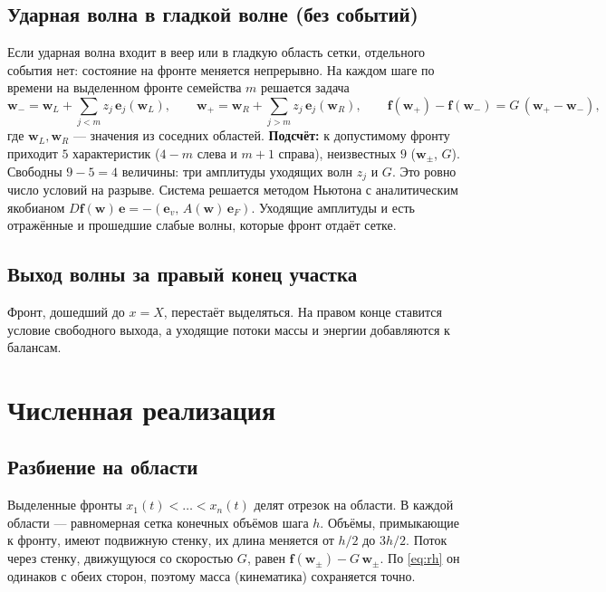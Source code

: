 \documentclass[11pt,a4paper]{article}
\theoremstyle{definition}
\theoremstyle{remark}
\newcommand{\bw}{\mathbf w}
\begin{document}
\subsection{Ударная волна в гладкой волне (без событий)}
Если ударная волна входит в веер или в гладкую область сетки, отдельного события нет: состояние на
фронте меняется непрерывно. На каждом шаге по времени на выделенном фронте семейства $m$ решается
задача
\begin{equation}\label{eq:front}
\bw_- = \bw_L + \sum_{j<m} z_j\,\mathbf e_j(\bw_L),\qquad
\bw_+ = \bw_R + \sum_{j>m} z_j\,\mathbf e_j(\bw_R),\qquad
\mathbf f(\bw_+)-\mathbf f(\bw_-) = G\,(\bw_+-\bw_-),
\end{equation}
где $\bw_L,\bw_R$ --- значения из соседних областей. \textbf{Подсчёт:} к допустимому фронту приходит
$5$ характеристик ($4-m$ слева и $m+1$ справа), неизвестных $9$ ($\bw_\pm$, $G$). Свободны
$9-5=4$ величины: три амплитуды уходящих волн $z_j$ и $G$. Это ровно число условий на разрыве.
Система решается методом Ньютона с аналитическим якобианом $D\mathbf f(\bw)\,\mathbf e = -(\mathbf e_v,\, A(\bw)\,\mathbf e_F)$.
Уходящие амплитуды и есть отражённые и прошедшие слабые волны, которые фронт отдаёт сетке.

\subsection{Выход волны за правый конец участка}
Фронт, дошедший до $x=X$, перестаёт выделяться. На правом конце ставится условие свободного
выхода, а уходящие потоки массы и энергии добавляются к балансам.

\section{Численная реализация}\label{sec:numerics}

\subsection{Разбиение на области}
Выделенные фронты $x_1(t)<\dots<x_n(t)$ делят отрезок на области. В каждой области ---
равномерная сетка конечных объёмов шага $h$. Объёмы, примыкающие к фронту, имеют подвижную стенку,
их длина меняется от $h/2$ до $3h/2$. Поток через стенку, движущуюся со скоростью $G$, равен
$\mathbf f(\bw_\pm) - G\,\bw_\pm$. По \eqref{eq:rh} он одинаков с обеих сторон, поэтому
масса (кинематика) сохраняется точно.
\end{document}
